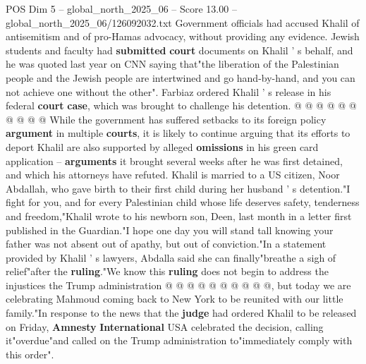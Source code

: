 \begin{textsample}{POS Dim 5 – global\_north\_2025\_06 – Score 13.00 – global\_north\_2025\_06/126092032.txt}
Government officials had accused Khalil of antisemitism and of pro-Hamas advocacy, without providing any evidence.
Jewish students and faculty had \textbf{submitted} \textbf{court} documents on Khalil ' s behalf, and he was quoted last year on CNN saying that"the liberation of the Palestinian people and the Jewish people are intertwined and go hand-by-hand, and you can not achieve one without the other".
Farbiaz ordered Khalil ' s release in his federal \textbf{court} \textbf{case}, which was brought to challenge his detention. @ @ @ @ @ @ @ @ @ @ While the government has suffered setbacks to its foreign policy \textbf{argument} in multiple \textbf{courts}, it is likely to continue arguing that its efforts to deport Khalil are also supported by alleged \textbf{omissions} in his green card application -- \textbf{arguments} it brought several weeks after he was first detained, and which his attorneys have refuted.
Khalil is married to a US citizen, Noor Abdallah, who gave birth to their first child during her husband ' s detention."I fight for you, and for every Palestinian child whose life deserves safety, tenderness and freedom,"Khalil wrote to his newborn son, Deen, last month in a letter first published in the Guardian."I hope one day you will stand tall knowing your father was not absent out of apathy, but out of conviction."In a statement provided by Khalil ' s lawyers, Abdalla said she can finally"breathe a sigh of relief"after the \textbf{ruling}."We know this \textbf{ruling} does not begin to address the injustices the Trump administration @ @ @ @ @ @ @ @ @ @, but today we are celebrating Mahmoud coming back to New York to be reunited with our little family."In response to the news that the \textbf{judge} had ordered Khalil to be released on Friday, \textbf{Amnesty} \textbf{International} USA celebrated the decision, calling it"overdue"and called on the Trump administration to"immediately comply with this order".

\end{textsample}
